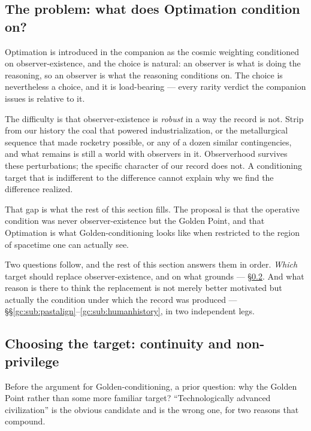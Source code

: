 \documentclass[11pt]{article}
\numberwithin{equation}{section}
\theoremstyle{plain}
\theoremstyle{definition}
\theoremstyle{remark}
\begin{document}
\subsection{The problem: what does Optimation condition on?}
\label{gc:sub:problem}

Optimation is introduced in the companion as the cosmic weighting
conditioned on observer-existence, and the choice is natural: an
observer is what is doing the reasoning, so an observer is what the
reasoning conditions on. The choice is nevertheless a choice, and it
is load-bearing --- every rarity verdict the companion issues is
relative to it.

The difficulty is that observer-existence is \emph{robust} in a way the
record is not. Strip from our history the coal that powered
industrialization, or the metallurgical sequence that made rocketry
possible, or any of a dozen similar contingencies, and what remains is
still a world with observers in it. Observerhood survives these
perturbations; the specific character of our record does not. A
conditioning target that is indifferent to the difference cannot
explain why we find the difference realized.

That gap is what the rest of this section fills. The proposal is that
the operative condition was never observer-existence but the Golden
Point, and that Optimation is what Golden-conditioning looks like when
restricted to the region of spacetime one can actually see.


\noindent Two questions follow, and the rest of this section answers them
in order. \emph{Which} target should replace observer-existence, and on
what grounds --- \S\ref{gc:sub:continuity}. And what reason is there to
think the replacement is not merely better motivated but actually the
condition under which the record was produced ---
\S\S\ref{gc:sub:pastalign}--\ref{gc:sub:humanhistory}, in two
independent legs.

\subsection{Choosing the target: continuity and non-privilege}\label{gc:sub:continuity}

Before the argument for Golden-conditioning, a prior question: why the
Golden Point rather than some more familiar target? ``Technologically
advanced civilization'' is the obvious candidate and is the wrong one,
for two reasons that compound.
\end{document}

